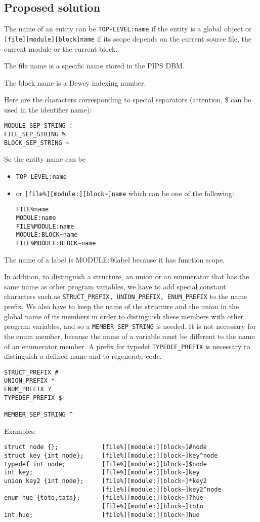 \documentclass[a4paper]{article}
\begin{document}
\subsection{Proposed solution}
The name of an entity can be \verb/TOP-LEVEL:name/ if the entity is a
global object or  
\verb/[file][module][block]name/ if its scope depends on the current source file,
the current module or the current block. 

The file name is a specific name stored in the PIPS DBM. 

The block name is a Dewey indexing number. 

Here are the characters corresponding to special separators (attention, \$
can be used in the identifier name): 
\begin{verbatim}
MODULE_SEP_STRING :
FILE_SEP_STRING %
BLOCK_SEP_STRING ~
\end{verbatim}  

So the entity name can be 
\begin{itemize}
\item 
\verb/TOP-LEVEL:name/
\item or 
\verb/[file%][module:][block~]name/ which can be one of the following: 
\begin{verbatim}
FILE%name
MODULE:name
FILE%MODULE:name
MODULE:BLOCK~name
FILE%MODULE:BLOCK~name
\end{verbatim}  
\end{itemize} 
The name of a label is MODULE:@label because it has function scope. 

In addition, to distinguish a structure, an union or an enumerator that has 
the same name as other program variables, we have to add special constant 
characters such as \verb/STRUCT_PREFIX, UNION_PREFIX, ENUM_PREFIX/ to 
the name prefix. We also have to keep the name of the structure and the union 
in the global name of its members in order to distinguish these members with 
other program variables, and so a \verb/MEMBER_SEP_STRING/ is needed. 
It is not necessary for the enum member, because the name of a variable must 
be different to the name of an enumerator member. 
A prefix for typedef \verb/TYPEDEF_PREFIX/ is necessary to distinguish a
defined name and to regenerate code. 
\begin{verbatim}
STRUCT_PREFIX #
UNION_PREFIX *
ENUM_PREFIX ?
TYPEDEF_PREFIX $

MEMBER_SEP_STRING ^
\end{verbatim}  

Examples: 
\begin{verbatim}
struct node {};            [file%][module:][block~]#node
struct key {int node};     [file%][module:][block~]key^node 
typedef int node;          [file%][module:][block~]$node
int key;                   [file%][module:][block~]key
union key2 {int node};     [file%][module:][block~]*key2 
                           [file%][module:][block~]key2^node 
enum hue {toto,tata};      [file%][module:][block~]?hue
                           [file%][module:][block~]toto 
int hue;                   [file%][module:][block~]hue
\end{verbatim}   
\end{document}
